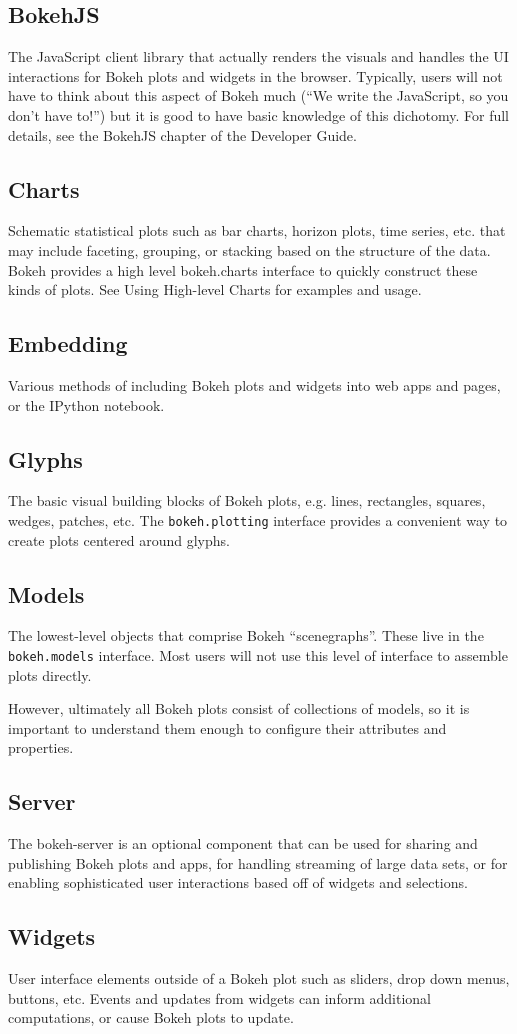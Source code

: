 \documentclass[a4paper,12pt]{article}
\begin{document}
\subsection*{BokehJS}
The JavaScript client library that actually renders the visuals and handles the UI interactions for Bokeh plots and widgets in the browser. Typically, users will not have to think about this aspect of Bokeh much (“We write the JavaScript, so you don’t have to!”) but it is good to have basic knowledge of this dichotomy. For full details, see the BokehJS chapter of the Developer Guide.
\subsection*{Charts}
Schematic statistical plots such as bar charts, horizon plots, time series, etc. that may include faceting, grouping, or stacking based on the structure of the data. Bokeh provides a high level bokeh.charts interface to quickly construct these kinds of plots. See Using High-level Charts for examples and usage.
\subsection*{Embedding}
Various methods of including Bokeh plots and widgets into web apps and pages, or the IPython notebook. 
\subsection*{Glyphs}
The basic visual building blocks of Bokeh plots, e.g. lines, rectangles, squares, wedges, patches, etc. The \texttt{bokeh.plotting} interface provides a convenient way to create plots centered around glyphs. 
\subsection*{Models}
The lowest-level objects that comprise Bokeh “scenegraphs”. These live in the \texttt{bokeh.models} interface. Most users will not use this level of interface to assemble plots directly. 

However, ultimately all Bokeh plots consist of collections of models, so it is important to understand them enough to configure their attributes and properties. 

\subsection*{Server}
The bokeh-server is an optional component that can be used for sharing and publishing Bokeh plots and apps, for handling streaming of large data sets, or for enabling sophisticated user interactions based off of widgets and selections. 

\subsection*{Widgets}
User interface elements outside of a Bokeh plot such as sliders, drop down menus, buttons, etc. Events and updates from widgets can inform additional computations, or cause Bokeh plots to update.
\end{document}
